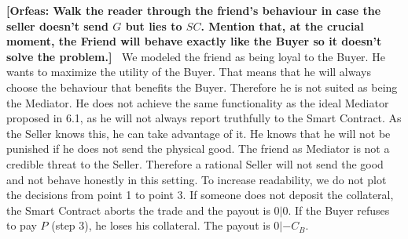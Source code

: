 \documentclass{cacthesis}
\newcommand{\authnote}[3]{{ \footnotesize \textbf{#1[#2: #3]~}}}
\newcommand{\orfnote}[1]{\authnote{\color{blue}}{Orfeas}{#1}}
\begin{document}
 \orfnote{Walk the reader through the
friend's behaviour in case the seller doesn't send $G$ but lies to $SC$. Mention
that, at the crucial moment, the Friend will behave exactly like the Buyer so it
doesn't solve the problem.}
We modeled the friend as being loyal to the Buyer. He wants to maximize the utility of the Buyer.\newline
That means that he will always choose the behaviour that benefits the Buyer. Therefore he is not suited as being the Mediator. He does not achieve the same functionality as the ideal Mediator proposed in 6.1, as he will not always report truthfully to the Smart Contract.\newline
As the Seller knows this, he can take advantage of it. He knows that he will not be punished if he does not send the physical good. The friend as Mediator is not a credible threat to the Seller. Therefore a rational Seller will not send the good and not behave honestly in this setting. 
To increase readability, we do not plot the decisions from point 1 to point 3.
If someone does not deposit the collateral, the Smart Contract aborts the trade
and the payout is $0|0$. If the Buyer refuses to pay $P$ (step 3), he loses his
collateral. The payout is $0|-C_B$.\newline

\end{document}
